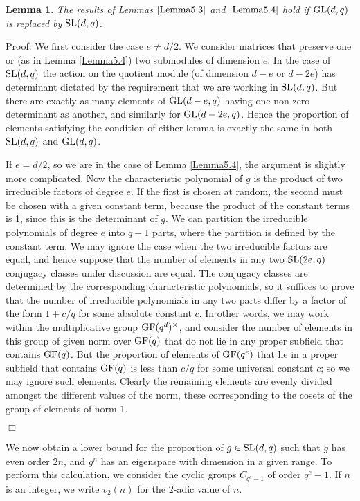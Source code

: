 \documentclass[12pt]{article}
\newtheorem{lemma}[definition]{Lemma}
\newenvironment{proof}{\normalsize {\sc Proof}:}{{\hfill $\Box$ \\}}
\def\SL{{\rm SL}}
\def\GL{{\rm GL}}
\def\GF{{\rm GF}}
\begin{document}
\begin{lemma}\label{Lemma5.5} The results of 
Lemmas $\ref{Lemma5.3}$ and $\ref{Lemma5.4}$ hold if $\GL(d,q)$
is replaced by $\SL(d,q)$.
\end{lemma}

\begin{proof}
We first consider the case $e\not=d/2$. 
We consider matrices that preserve one or (as in Lemma \ref{Lemma5.4}) 
two submodules of dimension $e$. 
In the case of $\SL(d,q)$ the action on the quotient module (of
dimension $d-e$ or $d-2e$)  has determinant dictated by the
requirement that we are working in $\SL(d,q)$. But there are exactly
as many elements of $\GL(d-e,q)$  having one non-zero determinant as
another, and similarly for $\GL(d-2e,q)$. Hence the 
proportion of elements satisfying the condition of either lemma is
exactly the same in both $\SL(d,q)$ and $\GL(d,q)$.

If $e=d/2$, so we are in the case of Lemma \ref{Lemma5.4}, 
the argument is slightly more complicated.
Now the characteristic polynomial of $g$ is the product of two
irreducible factors of degree $e$. If the first is chosen at random,
the second must be chosen  with a given  constant term, because
the product of the constant terms is 1, since this is the determinant of $g$.  We can partition the 
irreducible polynomials of degree $e$ into $q-1$ parts, where
the partition is defined by the constant term.   We may ignore the case when
the two irreducible factors are equal, and hence suppose that the number
of elements in any two $\SL(2e,q)$ conjugacy classes under discussion are equal.
The  conjugacy classes are determined by the corresponding characteristic
polynomials, so it suffices to prove that
the number of irreducible polynomials in any two parts differ by a factor of the form
$1+c/q$ for some absolute constant $c$.   In other words, we may work within the 
multiplicative group $\GF(q^d)^\times$, and consider the number of elements in this group
of given norm over $\GF(q)$ that do not lie in any proper subfield that contains $\GF(q)$.  But the proportion of elements
of $\GF(q^e)$ that lie in a proper subfield that contains $\GF(q)$ is less than $c/q$ for some universal
constant $c$; so we may ignore such elements.  Clearly the remaining elements are evenly divided
amongst the different values of the norm, these corresponding to the cosets of the group of elements of norm 1. 

\end{proof}

We now obtain a lower bound for the proportion of 
$g\in\SL(d,q)$ such that $g$ has even order $2n$, and $g^n$
has an eigenspace with dimension in a given range. 
To perform this calculation, we consider the cyclic groups $C_{q^e-1}$ of order
$q^e-1$. If $n$ is an integer, we write $v_2(n)$ for the $2$-adic
value of $n$.
\end{document}
